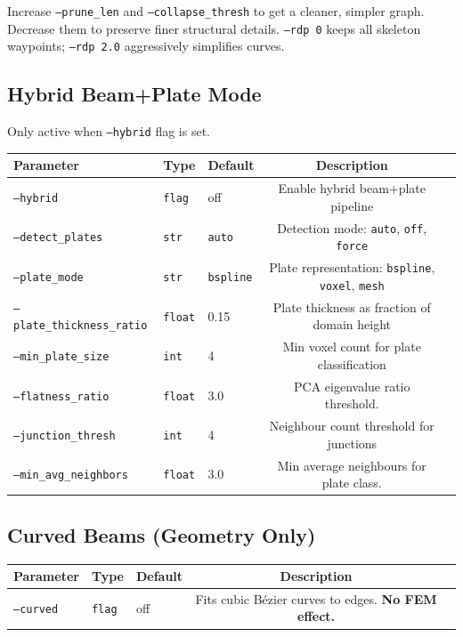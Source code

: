 \documentclass[11pt,a4paper]{article}
\begin{document}
\begin{tcolorbox}[colback=primary!5!white,colframe=primary!75!black,title=\textbf{Tuning Guidance}]
Increase \texttt{--prune\_len} and \texttt{--collapse\_thresh} to get a cleaner, simpler graph. Decrease them to preserve finer structural details. \texttt{--rdp 0} keeps all skeleton waypoints; \texttt{--rdp 2.0} aggressively simplifies curves.
\end{tcolorbox}

\subsection{Hybrid Beam+Plate Mode}

Only active when \texttt{--hybrid} flag is set.

\begin{table}[h]
\centering
\begin{tabularx}{\textwidth}{lllcX}
\toprule
\textbf{Parameter} & \textbf{Type} & \textbf{Default} & \textbf{Description} \\
\midrule
\texttt{--hybrid} & \texttt{flag} & off & Enable hybrid beam+plate pipeline \\
\texttt{--detect\_plates} & \texttt{str} & \texttt{auto} & Detection mode: \texttt{auto}, \texttt{off}, \texttt{force} \\
\texttt{--plate\_mode} & \texttt{str} & \texttt{bspline} & Plate representation: \texttt{bspline}, \texttt{voxel}, \texttt{mesh} \\
\texttt{--plate\_thickness\_ratio}& \texttt{float} & 0.15 & Plate thickness as fraction of domain height \\
\texttt{--min\_plate\_size} & \texttt{int} & 4 & Min voxel count for plate classification \\
\texttt{--flatness\_ratio} & \texttt{float} & 3.0 & PCA eigenvalue ratio threshold. \\
\texttt{--junction\_thresh} & \texttt{int} & 4 & Neighbour count threshold for junctions \\
\texttt{--min\_avg\_neighbors} & \texttt{float} & 3.0 & Min average neighbours for plate class. \\
\bottomrule
\end{tabularx}
\end{table}

\subsection{Curved Beams (Geometry Only)}
\begin{table}[h]
\centering
\begin{tabularx}{\textwidth}{lllcX}
\toprule
\textbf{Parameter} & \textbf{Type} & \textbf{Default} & \textbf{Description} \\
\midrule
\texttt{--curved} & \texttt{flag} & off & Fits cubic Bézier curves to edges. \textbf{No FEM effect.} \\
\bottomrule
\end{tabularx}
\end{table}
\end{document}
